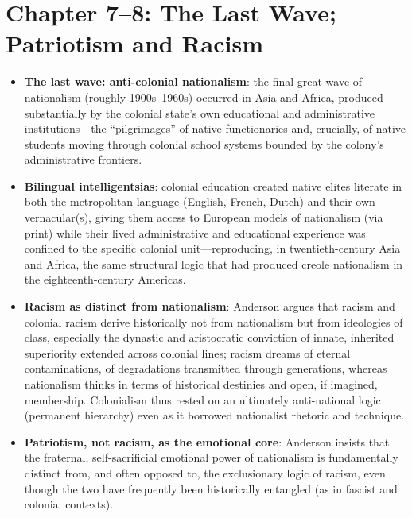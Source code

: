 \documentclass[12pt]{article}
\begin{document}
\section{Chapter 7--8: The Last Wave; Patriotism and Racism}

\begin{itemize}[leftmargin=*, itemsep=4pt]
    \item \textbf{The last wave: anti-colonial nationalism}: the final great wave of nationalism (roughly 1900s--1960s) occurred in Asia and Africa, produced substantially by the colonial state's own educational and administrative institutions---the ``pilgrimages'' of native functionaries and, crucially, of native students moving through colonial school systems bounded by the colony's administrative frontiers.
    \item \textbf{Bilingual intelligentsias}: colonial education created native elites literate in both the metropolitan language (English, French, Dutch) and their own vernacular(s), giving them access to European models of nationalism (via print) while their lived administrative and educational experience was confined to the specific colonial unit---reproducing, in twentieth-century Asia and Africa, the same structural logic that had produced creole nationalism in the eighteenth-century Americas.
    \item \textbf{Racism as distinct from nationalism}: Anderson argues that racism and colonial racism derive historically not from nationalism but from ideologies of class, especially the dynastic and aristocratic conviction of innate, inherited superiority extended across colonial lines; racism dreams of eternal contaminations, of degradations transmitted through generations, whereas nationalism thinks in terms of historical destinies and open, if imagined, membership. Colonialism thus rested on an ultimately anti-national logic (permanent hierarchy) even as it borrowed nationalist rhetoric and technique.
    \item \textbf{Patriotism, not racism, as the emotional core}: Anderson insists that the fraternal, self-sacrificial emotional power of nationalism is fundamentally distinct from, and often opposed to, the exclusionary logic of racism, even though the two have frequently been historically entangled (as in fascist and colonial contexts).
\end{itemize}

\end{document}
